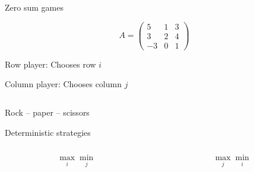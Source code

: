 \begin{frame}{Zero sum games}


\begin{equation*}
  \label{eq:34}
  A =
  \begin{pmatrix}
    5 & 1 & 3 \\
    3 & 2 & 4 \\
    -3 & 0 &1 
  \end{pmatrix} 
\end{equation*}

\medskip 

Row player: Chooses row $i$

\smallskip 
Column player: Chooses column $j$


  \begin{columns}
    \begin{column}{.5\textwidth}
      
    \end{column}
    \begin{column}{.5\textwidth}
      
    \end{column}       
  \end{columns}
\end{frame}



\begin{frame}{Rock --  paper -- scissors}

  
\end{frame}


\begin{frame}{Deterministic strategies}


  \begin{columns}
    \begin{column}{.5\textwidth}
      \begin{displaymath}
        \max_i \min_j
      \end{displaymath}
    \end{column}
    \begin{column}{.5\textwidth}
       \begin{displaymath}
        \max_j \min_i
      \end{displaymath}
    \end{column}       
  \end{columns}
  
\end{frame}


